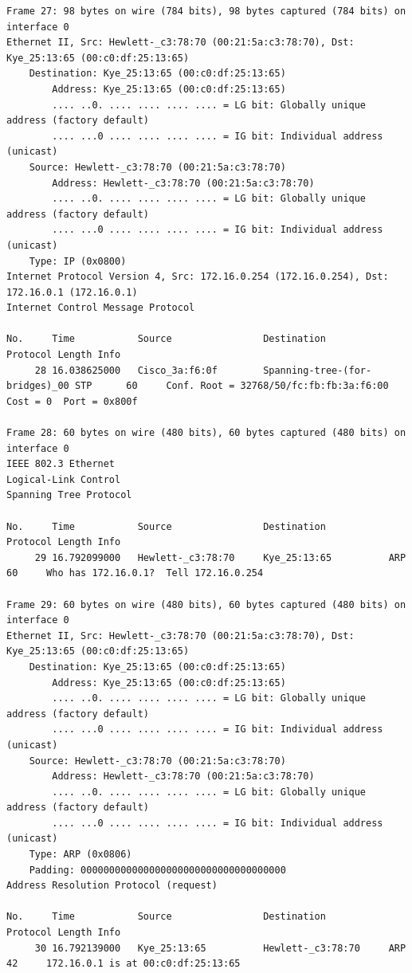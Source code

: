 \documentclass[a4paper,11pt]{article}
\begin{document}
\begin{lstlisting}
Frame 27: 98 bytes on wire (784 bits), 98 bytes captured (784 bits) on interface 0
Ethernet II, Src: Hewlett-_c3:78:70 (00:21:5a:c3:78:70), Dst: Kye_25:13:65 (00:c0:df:25:13:65)
    Destination: Kye_25:13:65 (00:c0:df:25:13:65)
        Address: Kye_25:13:65 (00:c0:df:25:13:65)
        .... ..0. .... .... .... .... = LG bit: Globally unique address (factory default)
        .... ...0 .... .... .... .... = IG bit: Individual address (unicast)
    Source: Hewlett-_c3:78:70 (00:21:5a:c3:78:70)
        Address: Hewlett-_c3:78:70 (00:21:5a:c3:78:70)
        .... ..0. .... .... .... .... = LG bit: Globally unique address (factory default)
        .... ...0 .... .... .... .... = IG bit: Individual address (unicast)
    Type: IP (0x0800)
Internet Protocol Version 4, Src: 172.16.0.254 (172.16.0.254), Dst: 172.16.0.1 (172.16.0.1)
Internet Control Message Protocol

No.     Time           Source                Destination           Protocol Length Info
     28 16.038625000   Cisco_3a:f6:0f        Spanning-tree-(for-bridges)_00 STP      60     Conf. Root = 32768/50/fc:fb:fb:3a:f6:00  Cost = 0  Port = 0x800f

Frame 28: 60 bytes on wire (480 bits), 60 bytes captured (480 bits) on interface 0
IEEE 802.3 Ethernet 
Logical-Link Control
Spanning Tree Protocol

No.     Time           Source                Destination           Protocol Length Info
     29 16.792099000   Hewlett-_c3:78:70     Kye_25:13:65          ARP      60     Who has 172.16.0.1?  Tell 172.16.0.254

Frame 29: 60 bytes on wire (480 bits), 60 bytes captured (480 bits) on interface 0
Ethernet II, Src: Hewlett-_c3:78:70 (00:21:5a:c3:78:70), Dst: Kye_25:13:65 (00:c0:df:25:13:65)
    Destination: Kye_25:13:65 (00:c0:df:25:13:65)
        Address: Kye_25:13:65 (00:c0:df:25:13:65)
        .... ..0. .... .... .... .... = LG bit: Globally unique address (factory default)
        .... ...0 .... .... .... .... = IG bit: Individual address (unicast)
    Source: Hewlett-_c3:78:70 (00:21:5a:c3:78:70)
        Address: Hewlett-_c3:78:70 (00:21:5a:c3:78:70)
        .... ..0. .... .... .... .... = LG bit: Globally unique address (factory default)
        .... ...0 .... .... .... .... = IG bit: Individual address (unicast)
    Type: ARP (0x0806)
    Padding: 000000000000000000000000000000000000
Address Resolution Protocol (request)

No.     Time           Source                Destination           Protocol Length Info
     30 16.792139000   Kye_25:13:65          Hewlett-_c3:78:70     ARP      42     172.16.0.1 is at 00:c0:df:25:13:65


\end{lstlisting}
\end{document}
